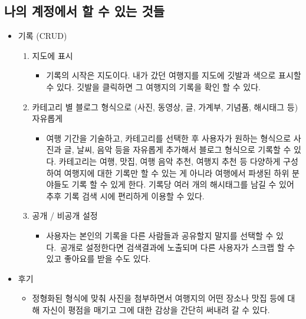 
\subsection{나의 계정에서 할 수 있는 것들}

\begin{itemize}
    \item 기록 (CRUD)
    \begin{enumerate}
        \item 지도에 표시
            \begin{itemize}
                \item[] 기록의 시작은 지도이다. 내가 갔던 여행지를 지도에 깃발과 색으로 표시할 수 있다. 깃발을 클릭하면 그 여행지의 기록을 확인 할 수 있다.
            \end{itemize}
        \item 카테고리 별 블로그 형식으로 (사진, 동영상, 글, 가계부, 기념품, 해시태그 등) 자유롭게
            \begin{itemize}
                \item[] 여행 기간을 기술하고, 카테고리를 선택한 후 사용자가 원하는 형식으로 사진과 글, 날씨, 음악 등을 자유롭게 추가해서 블로그 형식으로 기록할 수 있다. 카테고리는 여행, 맛집, 여행 음악 추천, 여행지 추천 등 다양하게 구성하여 여행지에 대한 기록만 할 수 있는 게 아니라 여행에서 파생된 하위 분야들도 기록 할 수 있게 한다. 기록당 여러 개의 해시태그를 남길 수 있어 추후 기록 검색 시에 편리하게 이용할 수 있다.
            \end{itemize}
        \item 공개 / 비공개 설정
            \begin{itemize}
                \item[] 사용자는 본인의 기록을 다른 사람들과 공유할지 말지를 선택할 수 있다. 공개로 설정한다면 검색결과에 노출되며 다른 사용자가 스크랩 할 수 있고 좋아요를 받을 수도 있다.
            \end{itemize}
    \end{enumerate}
\end{itemize}

\begin{itemize}
    \item 후기
        \begin{itemize}
            \item [] 정형화된 형식에 맞춰 사진을 첨부하면서 여행지의 어떤 장소나 맛집 등에 대해 자신이 평점을 매기고 그에 대한 감상을 간단히 써내려 갈 수 있다.
        \end{itemize}
\end{itemize}

